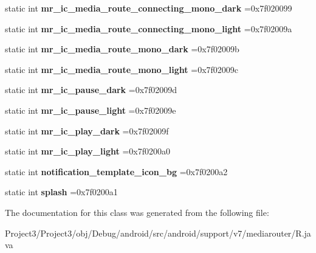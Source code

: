 \begin{DoxyCompactItemize}
static int {\bfseries mr\+\_\+ic\+\_\+media\+\_\+route\+\_\+connecting\+\_\+mono\+\_\+dark} =0x7f020099
\item 
\mbox{\label{classandroid_1_1support_1_1v7_1_1mediarouter_1_1R_1_1drawable_afbc9c2eb545af42f8f1e58836695995c}} 
static int {\bfseries mr\+\_\+ic\+\_\+media\+\_\+route\+\_\+connecting\+\_\+mono\+\_\+light} =0x7f02009a
\item 
\mbox{\label{classandroid_1_1support_1_1v7_1_1mediarouter_1_1R_1_1drawable_a77d074143c3cd2c21ba2ea201c6725b6}} 
static int {\bfseries mr\+\_\+ic\+\_\+media\+\_\+route\+\_\+mono\+\_\+dark} =0x7f02009b
\item 
\mbox{\label{classandroid_1_1support_1_1v7_1_1mediarouter_1_1R_1_1drawable_a81ed2d587a44ca64d1935c3542aad04f}} 
static int {\bfseries mr\+\_\+ic\+\_\+media\+\_\+route\+\_\+mono\+\_\+light} =0x7f02009c
\item 
\mbox{\label{classandroid_1_1support_1_1v7_1_1mediarouter_1_1R_1_1drawable_adf30b100b5020181be692a25b89715c1}} 
static int {\bfseries mr\+\_\+ic\+\_\+pause\+\_\+dark} =0x7f02009d
\item 
\mbox{\label{classandroid_1_1support_1_1v7_1_1mediarouter_1_1R_1_1drawable_a9cc75b2cb8b646430b5beafe2bf20b6c}} 
static int {\bfseries mr\+\_\+ic\+\_\+pause\+\_\+light} =0x7f02009e
\item 
\mbox{\label{classandroid_1_1support_1_1v7_1_1mediarouter_1_1R_1_1drawable_a8d2242d451588da71a0f777fb91db507}} 
static int {\bfseries mr\+\_\+ic\+\_\+play\+\_\+dark} =0x7f02009f
\item 
\mbox{\label{classandroid_1_1support_1_1v7_1_1mediarouter_1_1R_1_1drawable_a0ab479361d69f72649cb0a7297b34a36}} 
static int {\bfseries mr\+\_\+ic\+\_\+play\+\_\+light} =0x7f0200a0
\item 
\mbox{\label{classandroid_1_1support_1_1v7_1_1mediarouter_1_1R_1_1drawable_ab17f940ec8bd01208d747a09a94b0ca9}} 
static int {\bfseries notification\+\_\+template\+\_\+icon\+\_\+bg} =0x7f0200a2
\item 
\mbox{\label{classandroid_1_1support_1_1v7_1_1mediarouter_1_1R_1_1drawable_ae7d266d93b3ceaff3fffdd3be1431ab0}} 
static int {\bfseries splash} =0x7f0200a1
\end{DoxyCompactItemize}


The documentation for this class was generated from the following file\+:\begin{DoxyCompactItemize}
\item 
Project3/\+Project3/obj/\+Debug/android/src/android/support/v7/mediarouter/R.\+java\end{DoxyCompactItemize}
